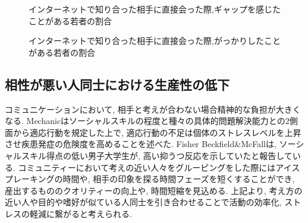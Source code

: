 \begin{figure}[htbp]
    \begin{center}
    \end{center}
    \caption{インターネットで知り合った相手に直接会った際,ギャップを感じたことがある若者の割合}
    \label{fig:onlinemeeting_to_real}
\end{figure}

\begin{figure}[htbp]
    \begin{center}
    \end{center}
    \caption{インターネットで知り合った相手に直接会った際,がっかりしたことがある若者の割合}
    \label{fig:onlinemeeting_to_real}
\end{figure}


\subsection{相性が悪い人同士における生産性の低下}
コミュニケーションにおいて, 相手と考えが合わない場合精神的な負担が大きくなる.
Mechanicはソーシャルスキルの程度と種々の具体的問題解決能力との2側面から適応行動を規定した上で,
適応行動の不足は個体のストレスレベルを上昇させ疾患発症の危険度を高めることを述べた.\cite{Mechanic}
Fisher Beckfield\&McFallは, ソーシャルスキル得点の低い男子大学生が,
高い抑うつ反応を示していたと報告している.\cite{FisherMcFall}
コミュニティーにおいて考えの近い人々をグルーピングをした際にはアイスプレーキングの時間や,
相手の印象を探る時間フェーズを短くすることができ, 産出するもののクオリティーの向上や, 時間短縮を見込める.
上記より, 考え方の近い人や目的や嗜好が似ている人同士を引き合わせることで活動の効率化,
ストレスの軽減に繋がると考えられる.


